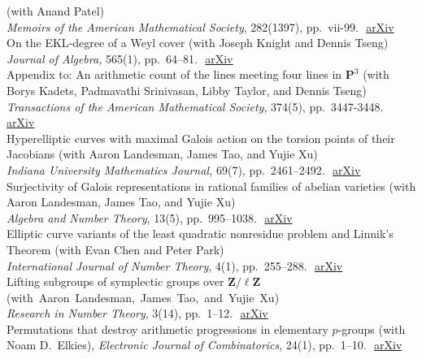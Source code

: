 \documentclass[11pt]{article} %
\begin{document}
 (with Anand Patel) \\
{\it Memoirs of the American Mathematical Society}, 282(1397), pp.~vii-99. \,\,\textcolor[rgb]{0,0,1}{\href{https://arxiv.org/pdf/1705.08761}{arXiv}} \\
 {On the EKL-degree of a Weyl cover} (with Joseph Knight and Dennis Tseng) \\
{\it Journal of Algebra,} 565(1), pp.~64--81.\,\, \textcolor[rgb]{0,0,1}{\href{https://arxiv.org/pdf/1907.03856}{arXiv}} \\
 {Appendix to: An arithmetic count of the lines meeting four lines in $\mathbf{P}^3$} (with Borys Kadets, Padmavathi Srinivasan, Libby Taylor, and Dennis Tseng)\\
{\it Transactions of the American Mathematical Society}, {374}(5), pp.~3447-3448.\,\, \textcolor[rgb]{0,0,1}{\href{https://arxiv.org/pdf/1810.03503}{arXiv}} \\
 {Hyperelliptic curves with maximal Galois action on the torsion points of their Jacobians} (with Aaron Landesman, James Tao, and Yujie Xu) \\
{\it Indiana University Mathematics Journal,} {69}(7), pp.~2461--2492.\,\,  \textcolor[rgb]{0,0,1}{\href{https://arxiv.org/pdf/1705.08777}{arXiv}} \\
 {Surjectivity of Galois representations in rational families of abelian varieties} (with Aaron Landesman, James Tao, and Yujie Xu) \\
{\it Algebra and Number Theory}, {13}(5), pp.~995--1038.\,\, \textcolor[rgb]{0,0,1}{\href{https://arxiv.org/pdf/1608.05371}{arXiv}} \\
 {Elliptic curve variants of the least quadratic nonresidue problem and Linnik's Theorem} (with Evan Chen and Peter Park) \\
{\it International Journal of Number Theory}, {4}(1), pp.~255--288.\,\, \textcolor[rgb]{0,0,1}{\href{https://arxiv.org/pdf/1507.07122}{arXiv}} \\
 {Lifting subgroups of symplectic groups over $\mathbf{Z}/\ell\mathbf{Z}$} \mbox{(with Aaron Landesman, James Tao, and Yujie Xu)}\\
{\it Research in Number Theory}, {3}(14), pp.~1--12.\,\, \textcolor[rgb]{0,0,1}{\href{https://arxiv.org/pdf/1607.04698}{arXiv}} \\
 {Permutations that destroy arithmetic progressions in elementary $p$-groups} (with Noam D.~Elkies), {\it Electronic Journal of Combinatorics}, {24}(1), pp.~1--10.\,\, \textcolor[rgb]{0,0,1}{\href{https://arxiv.org/pdf/1601.07541}{arXiv}} \\
\end{document}
